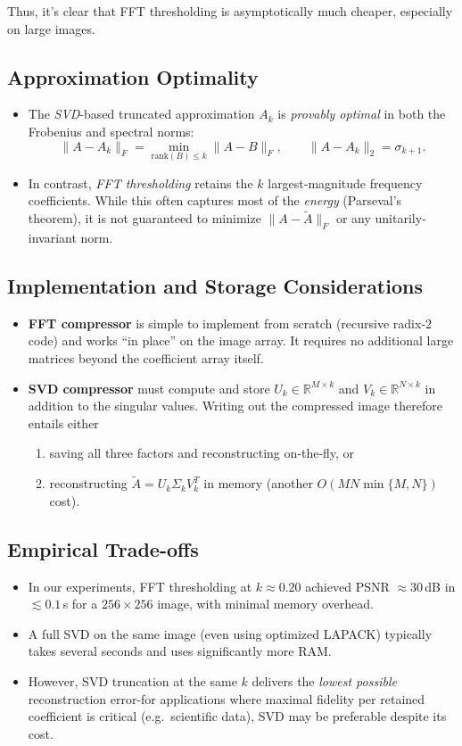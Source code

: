\documentclass[12pt]{article}
\begin{document}
\noindent Thus, it's clear that FFT thresholding is asymptotically much cheaper, especially on large images.

\subsection{Approximation Optimality}
\begin{itemize}
  \item The \emph{SVD}-based truncated approximation $A_k$ is \emph{provably optimal} in both the Frobenius and spectral norms:
  \[
    \|A - A_k\|_F = \min_{\mathrm{rank}(B)\le k}\|A-B\|_F,
    \qquad
    \|A - A_k\|_2 = \sigma_{k+1}.
  \]
  \item In contrast, \emph{FFT thresholding} retains the $k$ largest‐magnitude frequency coefficients.  While this often captures most of the \emph{energy} (Parseval’s theorem), it is not guaranteed to minimize $\|A-\tilde A\|_F$ or any unitarily‐invariant norm.  
\end{itemize}

\subsection{Implementation and Storage Considerations}
\begin{itemize}
  \item \textbf{FFT compressor} is simple to implement from scratch (recursive radix-2 code) and works “in place” on the image array.  It requires no additional large matrices beyond the coefficient array itself.
  \item \textbf{SVD compressor} must compute and store $U_k\in\mathbb{R}^{M\times k}$ and $V_k\in\mathbb{R}^{N\times k}$ in addition to the singular values.  Writing out the compressed image therefore entails either
    \begin{enumerate}
      \item saving all three factors and reconstructing on‐the‐fly, or  
      \item reconstructing $\tilde A=U_k\Sigma_kV_k^T$ in memory (another $O(MN\min\{M,N\})$ cost).
    \end{enumerate}
\end{itemize}

\subsection{Empirical Trade-offs}
\begin{itemize}
  \item In our experiments, FFT thresholding at $k\approx0.20$ achieved PSNR $\approx30\,$dB in $\lesssim0.1\,$s for a $256\times256$ image, with minimal memory overhead.
  \item A full SVD on the same image (even using optimized LAPACK) typically takes several seconds and uses significantly more RAM.
  \item However, SVD truncation at the same $k$ delivers the \emph{lowest possible} reconstruction error-for applications where maximal fidelity per retained coefficient is critical (e.g.\ scientific data), SVD may be preferable despite its cost.
\end{itemize}
\end{document}
